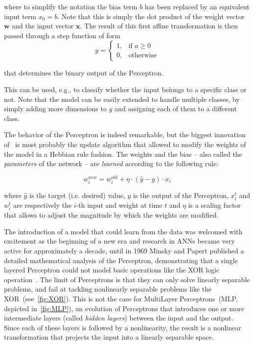 \noindent where to simplify the notation the bias term $b$ has been replaced
by an equivalent input term $x_0=b$. Note that this is simply the dot
product of the weight vector $\mathbf{w}$ and the input vector $\mathbf{x}$.
The result of this first affine transformation is then passed through a step
function of form
\begin{equation*}
    y =
        \begin{cases}
            1,          & \text{if } a \geq 0 \\
            0,         & \text{otherwise}
        \end{cases}
\end{equation*}

\noindent that determines the binary output of the Perceptron.

This can be used, e.g., to classify whether the input belongs to a specific
class or not. Note that the model can be easily extended to handle multiple
classes, by simply adding more dimensions to $y$ and assigning each of them to
a different class.

The behavior of the Perceptron is indeed remarkable, but the biggest innovation
of~\cite{Rosenblatt57} is most probably the update algorithm that allowed to
modify the weights of the model in a Hebbian rule fashion. The weights and the
bias -- also called the \emph{parameters} of the network -- are \emph{learned}
according to the following rule:

\begin{equation}\label{eq:perceptron_lr}
    w_i^{new} = w_i^{old} + \eta \cdot (\hat {y} - y) \cdot x_i
\end{equation}

\noindent where $\hat y$ is the target (i.e. desired) value, $y$ is the output
of the Perceptron, $x_i^t$ and $w_i^t$ are respectively the $i$-th input and
weight at time $t$ and $\eta$ is a scaling factor that allows to adjust the
magnitude by which the weights are modified.

The introduction of a model that could learn from the data
was welcomed with excitement as the beginning of a new era and
research in ANNs became very active for approximately a decade, until in
1969 Minsky and Papert published a detailed mathematical analysis of the
Perceptron, demonstrating that a single layered Perceptron could not model
basic operations like the XOR logic operation~\citep{Minsky69}. The limit of
Perceptrons is that they can only solve linearly separable problems, and fail
at tackling nonlinearly separable problems like the
XOR~(see~\autoref{fig:XOR}). This is not the case for MultiLayer
Perceptrons~(MLP, depicted in~\autoref{fig:MLP}), an evolution of Perceptrons
that introduces one or more intermediate layers (called \emph{hidden layers})
between the input and the output. Since each of these layers is followed by a
nonlinearity, the result is a nonlinear transformation that projects the input
into a linearly separable space.

